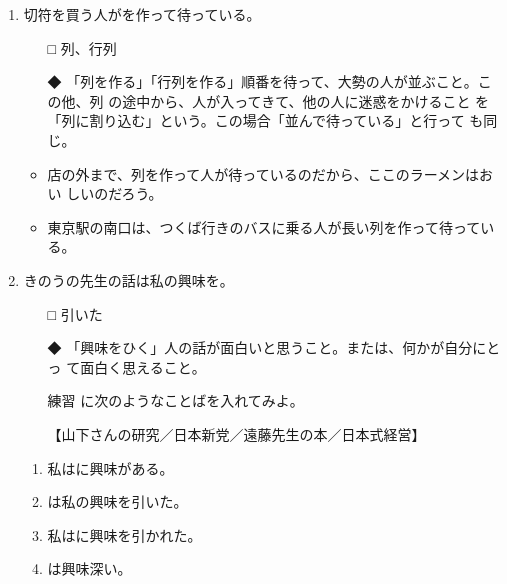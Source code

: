\documentclass[
uplatex,
b5paper,
10pt,
dvipdfmx
]{jsbook}
\begin{document}
\begin{enumerate}
\item 切符を買う人が\underline{\hspace{3zw}}を作って待っている。
\begin{itemize}
\item[□] 列、行列
\item[◆] 「列を作る」「行列を作る」順番を待って、大勢の人が並ぶこと。こ
	  の他、列 の途中から、人が入ってきて、他の人に迷惑をかけること
	  を「列に割り込む」という。この場合「並んで待っている」と行って
	  も同じ。
\end{itemize}
\begin{itemize}
\item 店の外まで、列を作って人が待っているのだから、ここのラーメンはおい
      しいのだろう。
\item 東京駅の南口は、つくば行きのバスに乗る人が長い列を作って待っている。 
\end{itemize}

\item きのうの先生の話は私の興味を\underline{\hspace{3zw}}。
\begin{itemize}
\item[□] 引いた 
\item[◆] 「興味をひく」人の話が面白いと思うこと。または、何かが自分にとっ
	  て面白く思えること。
\end{itemize}
\begin{itemize}
 \item[練習] \underline{\hspace{3zw}}に次のようなことばを入れてみよ。

	     【山下さんの研究／日本新党／遠藤先生の本／日本式経営】
\end{itemize}
\begin{enumerate}\itemsep=-4pt
 \item 私は\underline{\hspace{3zw}}に興味がある。
 \item \underline{\hspace{3zw}}は私の興味を引いた。
 \item 私は\underline{\hspace{3zw}}に興味を引かれた。
 \item \underline{\hspace{3zw}}は興味深い。
\end{enumerate}
            

\end{enumerate}
\end{document}
